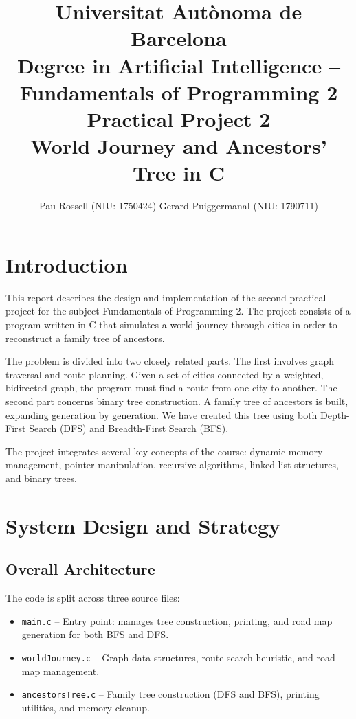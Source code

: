 \documentclass[12pt,a4paper]{article}
\title{
  {\large Universitat Aut\`{o}noma de Barcelona}\\
  {\large Degree in Artificial Intelligence -- Fundamentals of Programming 2}\\[0.4cm]
  {\LARGE \textbf{Practical Project 2}}\\[0.2cm]
  {\normalsize World Journey and Ancestors' Tree in C}
}
\author{
  Pau Rossell (NIU: 1750424) \quad Gerard Puiggermanal (NIU: 1790711)
}
\date{}
\begin{document}
\maketitle

\section*{Introduction}

This report describes the design and implementation of the second practical project for the subject Fundamentals of Programming 2. The project consists of a program written in C that simulates a world journey through cities in order to reconstruct a family tree of ancestors.

The problem is divided into two closely related parts. The first involves graph traversal and route planning. Given a set of cities connected by a weighted, bidirected graph, the program must find a route from one city to another. The second part concerns binary tree construction. A family tree of ancestors is built, expanding generation by generation. We have created this tree using both Depth-First Search (DFS) and Breadth-First Search (BFS).

The project integrates several key concepts of the course: dynamic memory management, pointer manipulation, recursive algorithms, linked list structures, and binary trees.

\section*{System Design and Strategy}

\subsection*{Overall Architecture}

The code is split across three source files:

\begin{itemize}
  \item \texttt{main.c} -- Entry point: manages tree construction, printing, and road map generation for both BFS and DFS.
  \item \texttt{worldJourney.c} -- Graph data structures, route search heuristic, and road map management.
  \item \texttt{ancestorsTree.c} -- Family tree construction (DFS and BFS), printing utilities, and memory cleanup.
\end{itemize}
\end{document}
